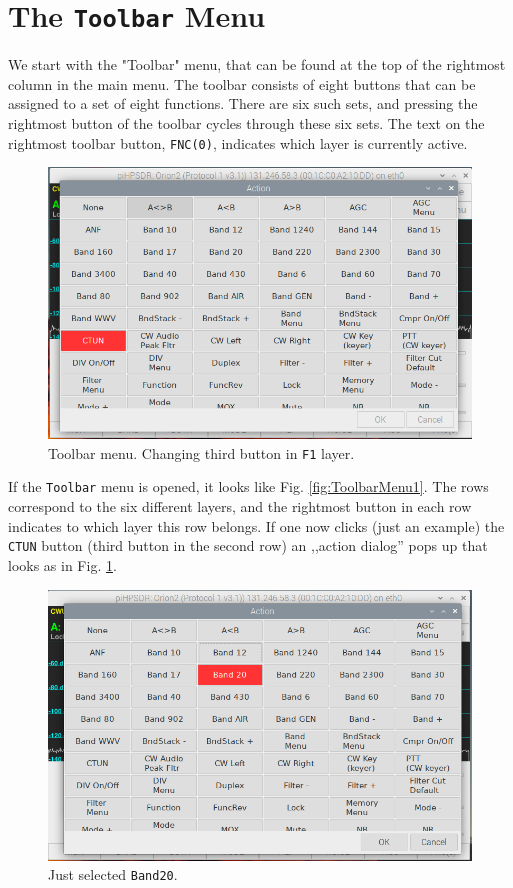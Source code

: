 \documentclass[12pt]{book}
\def\rett#1{\texttt{\color{red}#1}}
\def\bltt#1{\texttt{\color{blue}#1}}
\begin{document}
\section{The \texttt{Toolbar} Menu}
\label{sec:toolbarmenu}
We start with the "Toolbar" menu, that can be found at the top of the rightmost
column in the main menu. The toolbar consists of eight buttons that can be assigned
to a set of eight functions. There are six such sets, and pressing the rightmost button
of the toolbar cycles through these six sets. The text on the rightmost toolbar button, \rett{FNC(0)}, indicates which
layer is currently active.

\begin{figure}[ht!]
\center
\includegraphics[width=12cm]{ToolbarMenu2.png}
\caption{Toolbar menu. Changing third button in \texttt{F1} layer.}
\label{fig:ToolbarMenu2}
\end{figure}

If the \bltt{Toolbar} menu is opened, it looks like Fig. \ref{fig:ToolbarMenu1}.
The rows correspond to the six different layers, and the rightmost button in each
row indicates to which layer this row belongs.
 If one now clicks (just an example)
the \texttt{CTUN} button (third button in the second row) an ,,action dialog'' pops up that looks as
in Fig. \ref{fig:ToolbarMenu2}.


\begin{figure}[ht!]
\center
\includegraphics[width=12cm]{ToolbarMenu3.png}
\caption{Just selected \texttt{Band20}.}
\label{fig:ToolbarMenu3}
\end{figure}
\end{document}
